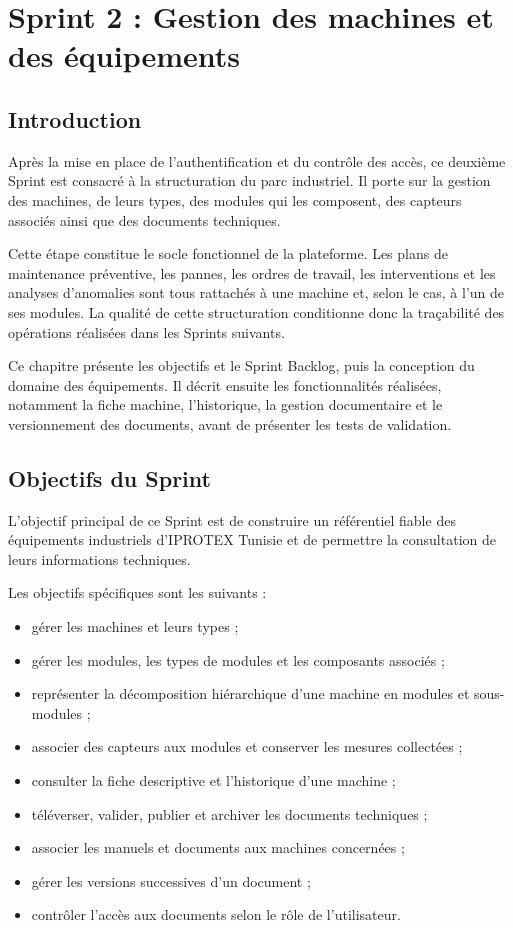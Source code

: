 \section{Sprint 2 : Gestion des machines et des équipements}

\subsection{Introduction}

Après la mise en place de l'authentification et du contrôle des accès, ce deuxième Sprint est consacré à la structuration du parc industriel. Il porte sur la gestion des machines, de leurs types, des modules qui les composent, des capteurs associés ainsi que des documents techniques.

Cette étape constitue le socle fonctionnel de la plateforme. Les plans de maintenance préventive, les pannes, les ordres de travail, les interventions et les analyses d'anomalies sont tous rattachés à une machine et, selon le cas, à l'un de ses modules. La qualité de cette structuration conditionne donc la traçabilité des opérations réalisées dans les Sprints suivants.

Ce chapitre présente les objectifs et le Sprint Backlog, puis la conception du domaine des équipements. Il décrit ensuite les fonctionnalités réalisées, notamment la fiche machine, l'historique, la gestion documentaire et le versionnement des documents, avant de présenter les tests de validation.

\subsection{Objectifs du Sprint}

L'objectif principal de ce Sprint est de construire un référentiel fiable des équipements industriels d'IPROTEX Tunisie et de permettre la consultation de leurs informations techniques.

Les objectifs spécifiques sont les suivants :

\begin{itemize}
    \item gérer les machines et leurs types ;
    \item gérer les modules, les types de modules et les composants associés ;
    \item représenter la décomposition hiérarchique d'une machine en modules et sous-modules ;
    \item associer des capteurs aux modules et conserver les mesures collectées ;
    \item consulter la fiche descriptive et l'historique d'une machine ;
    \item téléverser, valider, publier et archiver les documents techniques ;
    \item associer les manuels et documents aux machines concernées ;
    \item gérer les versions successives d'un document ;
    \item contrôler l'accès aux documents selon le rôle de l'utilisateur.
\end{itemize}

